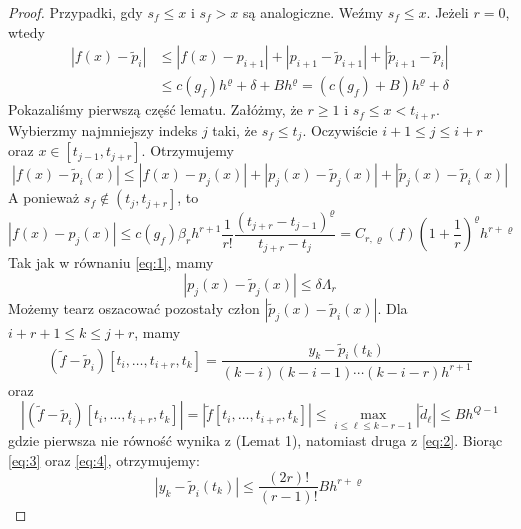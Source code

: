 \documentclass[oik, pdftex, robocza, man]{mgrwms}
\begin{document}
    \begin{proof}
        Przypadki, gdy $s_{f} \leq x$ i $s_{f} > x$ są analogiczne. Weźmy $s_{f} \leq x$. Jeżeli $r=0$, wtedy
        \begin{equation*}
            \begin{aligned}
                \left|f(x)-\tilde{p}_{i}\right| & \leq\left|f(x)-p_{i+1}\right|+\left|p_{i+1}-\tilde{p}_{i+1}\right|+\left|\tilde{p}_{i+1}-\tilde{p}_{i}\right| \\
                & \leq c\left(g_{f}\right) h^{\varrho}+\delta+B h^{\varrho}=\left(c\left(g_{f}\right)+B\right) h^{\varrho}+\delta
            \end{aligned}    
        \end{equation*}
        Pokazaliśmy pierwszą część lematu.
        Załóżmy, że $r \geq 1$ i $s_{f} \leq x<t_{i+r}$. Wybierzmy najmniejszy indeks $j$ taki, że $s_{f} \leq t_{j}$. Oczywiście $i+1 \leq j \leq i+r$ oraz $x \in\left[t_{j-1}, t_{j+r}\right]$. 
        Otrzymujemy
        \begin{equation} \label{eq:6}
            \left|f(x)-\tilde{p}_{i}(x)\right| \leq\left|f(x)-p_{j}(x)\right|+\left|p_{j}(x)-\tilde{p}_{j}(x)\right|+\left|\tilde{p}_{j}(x)-\tilde{p}_{i}(x)\right|
        \end{equation}
        A ponieważ $s_{f} \notin\left(t_{j}, t_{j+r}\right]$, to
        \begin{equation*}
            \left|f(x)-p_{j}(x)\right| \leq c\left(g_{f}\right) \beta_{r} h^{r+1} \frac{1}{r !} \frac{\left(t_{j+r}-t_{j-1}\right)^{\varrho}}{t_{j+r}-t_{j}}=C_{r, \varrho}(f)\left(1+\frac{1}{r}\right)^{\varrho} h^{r+\varrho}
        \end{equation*}
        Tak jak w równaniu \eqref{eq:1}, mamy
        \begin{equation*}
            \left|p_{j}(x)-\tilde{p}_{j}(x)\right| \leq \delta \Lambda_{r}            
        \end{equation*}
        Możemy tearz oszacować pozostały człon $\left|\tilde{p}_{j}(x)-\tilde{p}_{i}(x)\right|$. Dla $i+r+1 \leq k \leq j+r$, mamy
        \begin{equation} \label{eq:3}
            \left(\tilde{f}-\tilde{p}_{i}\right)\left[t_{i}, \ldots, t_{i+r}, t_{k}\right]=\frac{y_{k}-\tilde{p}_{i}\left(t_{k}\right)}{(k-i)(k-i-1) \cdots(k-i-r) h^{r+1}}
        \end{equation}
        oraz
        \begin{equation} \label{eq:4}
            \left|\left(\tilde{f}-\tilde{p}_{i}\right)\left[t_{i}, \ldots, t_{i+r}, t_{k}\right]\right|=\left|\tilde{f}\left[t_{i}, \ldots, t_{i+r}, t_{k}\right]\right| \leq \max _{i \leq \ell \leq k-r-1}\left|\tilde{d}_{\ell}\right| \leq B h^{Q-1}            
        \end{equation}
        gdzie pierwsza nie równość wynika z \cite{UA}(Lemat 1), natomiast druga z \eqref{eq:2}. Biorąc \eqref{eq:3} oraz \eqref{eq:4}, otrzymujemy:
        \begin{equation} \label{eq:5}
            \left|y_{k}-\tilde{p}_{i}\left(t_{k}\right)\right| \leq \frac{(2 r) !}{(r-1) !} B h^{r+\varrho}
        \end{equation}


\end{proof}
\end{document}
